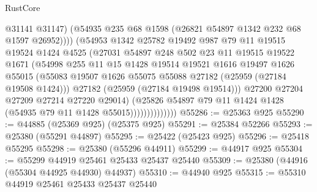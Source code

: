 \begin{lexlean}{RustCore}
\begin{coremodule}
                                @31141
                                @31147)
                              (@54935 @235 @68 @1598 (@26821 @54897 @1342 @232 @68 @1597 @26952))))
                          (@54953
                            @1342
                            @25782
                            @19492
                            @987
                            @79
                            @11
                            @19515
                            @19524
                            @1424
                            @4525
                            (@27031
                              @54897
                              @248
                              @502
                              @23
                              @11
                              @19515
                              @19522
                              @1671
                              (@54998
                                @255
                                @11
                                @15
                                @1428
                                @19514
                                @19521
                                @1616
                                @19497
                                @1626
                                @55015
                                (@55083
                                  @19507
                                  @1626
                                  @55075
                                  @55088
                                  @27182
                                  (@25959 (@27184 @19508 @1424)))
                                @27182
                                (@25959 (@27184 @19498 @19514)))
                              @27200
                              @27204
                              @27209
                              @27214
                              @27220
                              @29014)
                            (@25826
                              @54897
                              @79
                              @11
                              @1424
                              @1428
                              (@54935 @79 @11 @1428 @55015))))))))))))))
@55286 := @25363 @925
@55290 := @44885 (@25369 @925) (@25375 @925)
@55291 := @25384 @52266
@55293 := @25380 (@55291 @44897)
@55295 := @25422 (@25423 @925)
@55296 := @25418 @55295
@55298 := @25380 (@55296 @44911)
@55299 := @44917 @925
@55304 := @55299 @44919 @25461 @25433 @25437 @25440
@55309 := @25380 (@44916 (@55304 @44925 @44930) @44937)
@55310 := @44940 @925
@55315 := @55310 @44919 @25461 @25433 @25437 @25440

\end{coremodule}
\end{lexlean}
